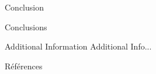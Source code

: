 \documentclass[final]{beamer}
\newlength{\onecolwid}
\begin{document}
\begin{frame}[t]
\begin{columns}[t]
\begin{column}{\onecolwid} %




\begin{block}{Conclusion}

Conclusions

\end{block}


\begin{block}{Additional Information}
Additional Info...
\end{block}


\begin{block}{Références}

\nocite{*} %
\small{
\vspace{0.75in}}

\end{block}




\end{column}
\end{columns}
\end{frame}
\end{document}
